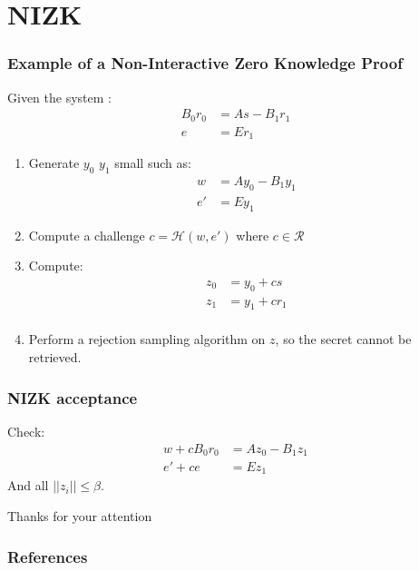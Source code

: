 \documentclass[presentation]{beamer}
\begin{document}
\section{NIZK}
\begin{frame}[label=non-interactive-zero-knowledge-proof]
  \frametitle{Example of a Non-Interactive Zero Knowledge Proof}

  Given the system \cite{nizk}:
  \begin{equation*}
    \begin{array}{rl}
      B_0r_0 &= As - B_1r_1 \\
      e &= E r_1
    \end{array}
  \end{equation*}

  \begin{enumerate}
    \item Generate $y_0$ $y_1$ small such as:
      \begin{equation*}
        \begin{array}{rl}
          w  &= Ay_0 - B_1y_1 \\
          e' &= E y_1
        \end{array}
      \end{equation*}
    \item Compute a challenge $c = \mathcal H (w, e')$ where
      $c \in \mathcal R$
    \item Compute:
      \begin{equation*}
        \begin{array}{rl}
          z_0 &= y_0 + cs \\
          z_1 &= y_1 + cr_1 \\
        \end{array}
      \end{equation*}
    \item Perform a rejection sampling algorithm on $z$, 
      so the secret cannot be retrieved.
  \end{enumerate}
\end{frame}

\begin{frame}
  \frametitle{NIZK acceptance}

  Check:
  \begin{equation*}
    \begin{array}{rl}
      w + cB_0r_0 &= Az_0 - B_1z_1 \\
      e' + ce &= E z_1
    \end{array}
  \end{equation*}
  And all $||z_i|| \leq \beta$.
\end{frame}

\begin{frame}
  \huge{Thanks for your attention}
\end{frame}
\begin{frame}[allowframebreaks]
  \frametitle{References}
  
  
\end{frame}
\end{document}
